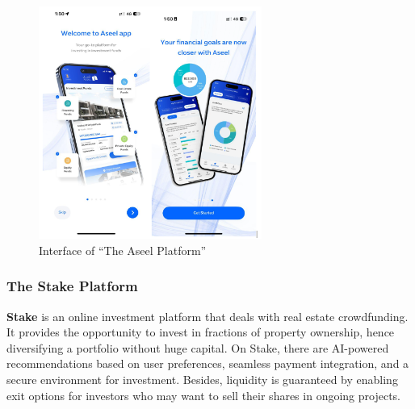 \begin{figure}[htbp]
    \centering
    \includegraphics[width=0.65\textwidth]{images/Interface-of-the Aseel Platform.png}
    \caption{Interface of ``The Aseel Platform''}
    \label{fig:aseel-platform}
\end{figure}

\begin{center}
    \vspace{0.5em}
    \vspace{0.5em}
\end{center}

\subsubsection{The Stake Platform}

\textbf{\textcolor{primary}{Stake}} is an online investment platform that deals with real estate crowdfunding. It provides the opportunity to invest in fractions of property ownership, hence diversifying a portfolio without huge capital. On Stake, there are AI-powered recommendations based on user preferences, seamless payment integration, and a secure environment for investment. Besides, liquidity is guaranteed by enabling exit options for investors who may want to sell their shares in ongoing projects.

